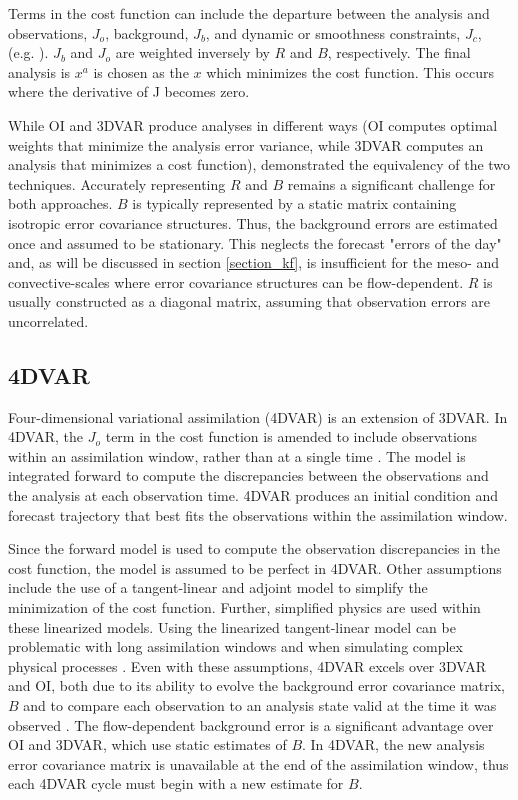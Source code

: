 Terms in the cost function can include the departure between the analysis and observations, \(J_o\), background, \(J_b\), and dynamic or smoothness constraints, \(J_c\), (e.g. \citealt{gaoetal03,geetal12}). \(J_b\) and \(J_o\) are weighted inversely by \(R\) and \(B\), respectively. The final analysis is  \(x^a\) is chosen as the \(x\) which minimizes the cost function. This occurs where the derivative of J becomes zero.

While OI and 3DVAR produce analyses in different ways (OI computes optimal weights that minimize the analysis error variance, while 3DVAR computes an analysis that minimizes a cost function), \citet{lorenc86} demonstrated the equivalency of the two techniques. Accurately representing \(R\) and \(B\) remains a significant challenge for both approaches. \(B\) is typically represented by a static matrix containing isotropic error covariance structures. Thus, the background errors are estimated once and assumed to be stationary. This neglects the forecast "errors of the day" and, as will be discussed in section \ref{section_kf}, is insufficient for the meso- and convective-scales where error covariance structures can be flow-dependent.  \(R\) is usually constructed as a diagonal matrix, assuming that observation errors are uncorrelated.

\subsection{4DVAR}
Four-dimensional variational assimilation (4DVAR) is an extension of 3DVAR. In 4DVAR, the \(J_o\) term in the cost function is amended to include observations within an assimilation window, rather than at a single time \citep{talagrandcourtier87}. The model is integrated forward to compute the discrepancies between the observations and the analysis at each observation time. 4DVAR produces an initial condition and forecast trajectory that best fits the observations within the assimilation window.

Since the forward model is used to compute the observation discrepancies in the cost function, the model is assumed to be perfect in 4DVAR. Other assumptions include the use of a tangent-linear and adjoint model to simplify the minimization of the cost function. Further, simplified physics are used within these linearized models. Using the linearized tangent-linear model can be problematic with long assimilation windows and when simulating complex physical processes \citep{tremolet04}.  Even with these assumptions, 4DVAR excels over 3DVAR and OI, both due to its ability to evolve the background error covariance matrix, \(B\) and to compare each observation to an analysis state valid at the time it was observed \citep{lorenc05}. The flow-dependent background error is a significant advantage over OI and 3DVAR, which use static estimates of \(B\). In 4DVAR, the new analysis error covariance matrix is unavailable at the end of the assimilation window, thus each 4DVAR cycle must begin with a new estimate for \(B\).

